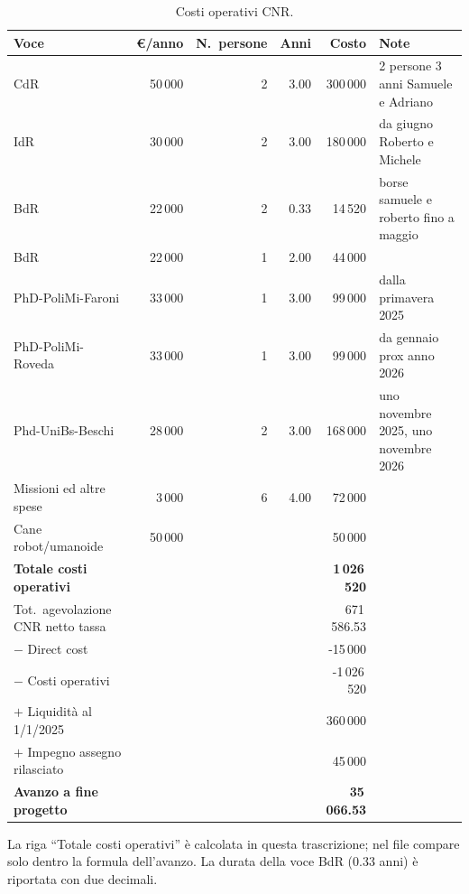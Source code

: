 \documentclass{plan4ari_report}
\begin{document}
\begin{table}[H]\centering\footnotesize\caption{Costi operativi CNR.}\label{tab:cnr-op}
\begin{tabular}{lrrrr>{\raggedright\arraybackslash}p{4.2cm}}\toprule\textbf{Voce} & \textbf{\euro/anno} & \textbf{N.\ persone} & \textbf{Anni} & \textbf{Costo} & \textbf{Note} \\\midrule
CdR & 50\,000 & 2 & 3.00 & 300\,000 & \footnotesize 2 persone 3 anni Samuele e Adriano \\
IdR & 30\,000 & 2 & 3.00 & 180\,000 & \footnotesize da giugno Roberto e Michele \\
BdR & 22\,000 & 2 & 0.33 & 14\,520 & \footnotesize borse samuele e roberto fino a maggio \\
BdR & 22\,000 & 1 & 2.00 & 44\,000 & \footnotesize  \\
PhD-PoliMi-Faroni & 33\,000 & 1 & 3.00 & 99\,000 & \footnotesize dalla primavera 2025 \\
PhD-PoliMi-Roveda & 33\,000 & 1 & 3.00 & 99\,000 & \footnotesize da gennaio prox anno 2026 \\
Phd-UniBs-Beschi & 28\,000 & 2 & 3.00 & 168\,000 & \footnotesize uno novembre 2025, uno novembre 2026 \\
Missioni ed altre spese & 3\,000 & 6 & 4.00 & 72\,000 & \footnotesize  \\
Cane robot/umanoide & 50\,000 &  &  & 50\,000 & \footnotesize  \\
\midrule\textbf{Totale costi operativi} & & & & \textbf{1\,026\,520} & \\
\midrule Tot.\ agevolazione CNR netto tassa & & & & 671\,586.53 & \\
$-$ Direct cost & & & & -15\,000 & \\
$-$ Costi operativi & & & & -1\,026\,520 & \\
$+$ Liquidità al 1/1/2025 & & & & 360\,000 & \\
$+$ Impegno assegno rilasciato & & & & 45\,000 & \\
\midrule\textbf{Avanzo a fine progetto} & & & & \textbf{35\,066.53} & \\
\bottomrule\end{tabular}
\par\smallskip\footnotesize La riga ``Totale costi operativi'' \`e calcolata in questa trascrizione; nel file compare solo dentro la formula dell'avanzo. La durata della voce BdR (0.33 anni) \`e riportata con due decimali.
\end{table}
\end{document}
